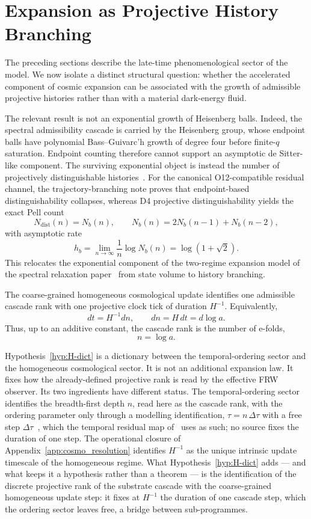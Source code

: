 \section{Expansion as Projective History Branching}
\label{sec:history-branching-expansion}

The preceding sections describe the late-time phenomenological sector of the model.
We now isolate a distinct structural question: whether the accelerated component of cosmic expansion can be
associated with the growth of admissible projective histories rather than with a material dark-energy fluid.

The relevant result is not an exponential growth of Heisenberg balls.
Indeed, the spectral admissibility cascade is carried by the Heisenberg group, whose endpoint balls have
polynomial Bass--Guivarc'h growth of degree four before finite-$q$ saturation.
Endpoint counting therefore cannot support an asymptotic de Sitter-like component.
The surviving exponential object is instead the number of projectively distinguishable
histories~\cite{Beau2026tb}.
For the canonical O12-compatible residual channel, the trajectory-branching note proves that endpoint-based
distinguishability collapses, whereas D4 projective distinguishability yields the exact Pell count
\[
N_{\mathrm{dist}}(n)=N_b(n),
\qquad
N_b(n)=2N_b(n-1)+N_b(n-2),
\]
with asymptotic rate
\[
h_b=\lim_{n\to\infty}\frac{1}{n}\log N_b(n)
=\log(1+\sqrt{2}).
\]
This relocates the exponential component of the two-regime expansion model of the spectral relaxation
paper~\cite{Beau2026a5} from state volume to history branching.

\begin{Hypothesis}
\label{hyp:H-dict}
The coarse-grained homogeneous cosmological update identifies one admissible cascade rank with one projective
clock tick of duration $H^{-1}$.
Equivalently,
\[
dt = H^{-1}dn,
\qquad
dn = H\,dt = d\log a.
\]
Thus, up to an additive constant, the cascade rank is the number of e-folds,
\[
n=\log a.
\]
\end{Hypothesis}

Hypothesis~\ref{hyp:H-dict} is a dictionary between the temporal-ordering sector and the homogeneous
cosmological sector.
It is not an additional expansion law.
It fixes how the already-defined projective rank is read by the effective FRW observer.
Its two ingredients have different status.
The temporal-ordering sector identifies the breadth-first depth $n$, read here as the cascade rank, with the
ordering parameter only through a modelling identification, $\tau = n\,\Delta\tau$ with a free step
$\Delta\tau$~\cite{Beau2026q11}, which the temporal residual map of~\cite{Beau2026tp} uses as such; no source fixes
the duration of one step.
The operational closure of Appendix~\ref{app:cosmo_resolution} identifies $H^{-1}$ as the unique intrinsic update
timescale of the homogeneous regime.
What Hypothesis~\ref{hyp:H-dict} adds --- and what keeps it a hypothesis rather than a theorem --- is the
identification of the discrete projective rank of the substrate cascade with the coarse-grained homogeneous
update step: it fixes at $H^{-1}$ the duration of one cascade step, which the ordering sector leaves free, a
bridge between sub-programmes.

